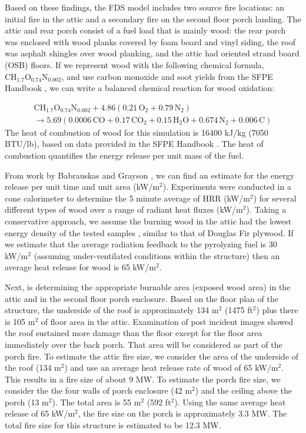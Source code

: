 \documentclass[11pt,oneside]{book}
\renewcommand{\C}{\mbox{C}}
\renewcommand{\H}{\mbox{H}}
\renewcommand{\O}{\mbox{O}}
\newcommand{\N}{\mbox{N}}
\begin{document}
Based on these findings, the FDS model includes two source fire locations: an initial fire in the attic and a secondary fire on the second floor porch landing. The attic and rear porch consist of a fuel load that is mainly wood: the rear porch was enclosed with wood planks covered by foam board and vinyl siding, the roof was asphalt shingles over wood planking, and the attic had oriented strand board (OSB) floors. If we represent wood with the following chemical formula, $\C\H_{1.7}\O_{0.74}\N_{0.002}$, and use carbon monoxide and soot yields from the SFPE Handbook \cite{SFPE:Tewarson}, we can write a balanced chemical reaction for wood oxidation:

\begin{multline}
\C\H_{1.7}\O_{0.74}\N_{0.002} + 4.86(0.21\,\O_{2} + 0.79\,\N_{2}) \\ 
\rightarrow 5.69(0.0006\,\C\O + 0.17\,\C\O_{2} + 0.15\,\H_{2}\O + 0.674\,\N_{2} + 0.006\,\C)
\label{eq:wood_comb}
\end{multline}
The heat of combustion of wood for this simulation is 16400 kJ/kg (7050 BTU/lb), based on data provided in the SFPE Handbook \cite{SFPE:Tewarson}. The heat of combustion quantifies the energy release per unit mass of the fuel.

From work by Babrauskas and Grayson \cite{babrauskas1990}, we can find an estimate for the energy release per unit time and unit area (kW/m$^2$). Experiments were conducted in a cone calorimeter to determine the 5 minute average of HRR (kW/m$^2$) for several different types of wood over a range of radiant heat fluxes (kW/m$^2$). Taking a conservative approach, we assume the burning wood in the attic had the lowest energy density of the tested samples \cite{babrauskas1990}, similar to that of Douglas Fir plywood. If we estimate that the average radiation feedback to the pyrolyzing fuel is 30 kW/m$^2$ (assuming under-ventilated conditions within the structure) then an average heat release for wood is 65 kW/m$^2$.

Next, is determining the appropriate burnable area (exposed wood area) in the attic and in the second floor porch enclosure. Based on the floor plan of the structure, the underside of the roof is approximately 134 m$^2$ (1475 ft$^2$) plus there is 105 m$^2$ of floor area in the attic. Examination of post incident images showed the roof sustained more damage than the floor except for the floor area immediately over the back porch. That area will be considered as part of the porch fire. To estimate the attic fire size, we consider the area of the underside of the roof (134 m$^2$) and use an average heat release rate of wood of 65 kW/m$^2$. This results in a fire size of about 9 MW. To estimate the porch fire size, we consider the the four walls of porch enclosure (42 m$^2$) and the ceiling above the porch (13 m$^2$). The total area is 55 m$^2$ (592 ft$^2$). Using the same average heat release of 65 kW/m$^2$, the fire size on the porch is approximately 3.3 MW. The total fire size for this structure is estimated to be 12.3 MW.
\end{document}
